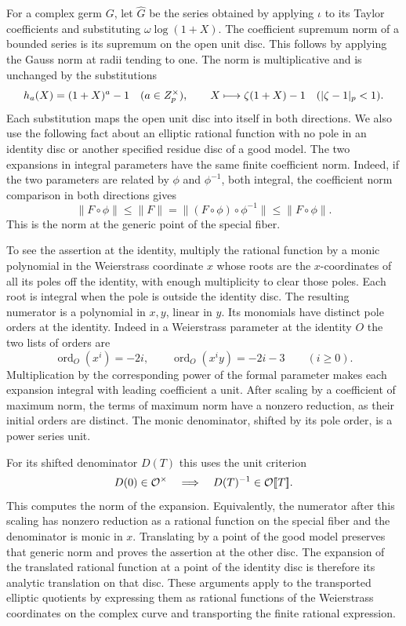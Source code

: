 For a complex germ \(G\), let \(\widehat G\) be the series
obtained by applying \(\iota\) to its Taylor coefficients
and substituting \(\omega\log(1+X)\). The coefficient
supremum norm of a bounded series is its supremum on the open
unit disc. This follows by applying the Gauss norm at radii
tending to one. The norm is multiplicative and is unchanged
by the substitutions
\[
 h_a(X)=(1+X)^a-1\quad(a\in Z_p^\times),\qquad
 X\longmapsto \zeta(1+X)-1\quad(\lvert\zeta-1\rvert_p<1).
\]
Each substitution maps the open unit disc into itself
in both directions. We also use the following fact about an
elliptic rational function with no pole in an identity disc
or another specified residue disc of a good model. The two
expansions in integral parameters have the same finite
coefficient norm.
Indeed, if the two parameters are related by \(\phi\) and \(\phi^{-1}\), both integral, the coefficient norm comparison in both directions gives
\[
  \|F\circ\phi\|\le\|F\|=\|(F\circ\phi)\circ\phi^{-1}\|\le\|F\circ\phi\|.
\]
 This is the norm at the generic point of the
special fiber.

To see the assertion at the identity, multiply
the rational function by a monic polynomial in the Weierstrass
coordinate \(x\) whose roots are the \(x\)-coordinates of all
its poles off the identity, with enough multiplicity to clear
those poles. Each root is integral when the pole is outside the
identity disc. The resulting numerator is a polynomial in
\(x,y\), linear in \(y\). Its monomials have distinct pole
orders at the identity.
Indeed in a Weierstrass parameter at the identity \(O\) the two lists of orders are
\[
  \operatorname{ord}_O(x^i)=-2i,\qquad \operatorname{ord}_O(x^iy)=-2i-3\qquad(i\ge0).
\]
 Multiplication by the corresponding
power of the formal parameter makes each expansion integral
with leading coefficient a unit. After scaling by a coefficient
of maximum norm, the terms of maximum norm have a nonzero
reduction, as their initial orders are distinct. The monic
denominator, shifted by its pole order, is a power series
unit.

For its shifted denominator \(D(T)\) this uses the unit criterion
\[
  D(0)\in{\cal O}^{\times}\quad\Longrightarrow\quad D(T)^{-1}\in{\cal O}[\![T]\!].
\]
 This computes the norm of the expansion. Equivalently,
the numerator after this scaling has nonzero reduction as a
rational function on the special fiber and the denominator is
monic in \(x\). Translating by a point of the good model
preserves that generic norm and proves the assertion at the
other disc. The expansion of the translated rational function
at a point of the identity disc is therefore its analytic
translation on that disc. These arguments apply to the
transported elliptic quotients by expressing them as rational
functions of the Weierstrass coordinates on the complex curve
and transporting the finite rational expression.

